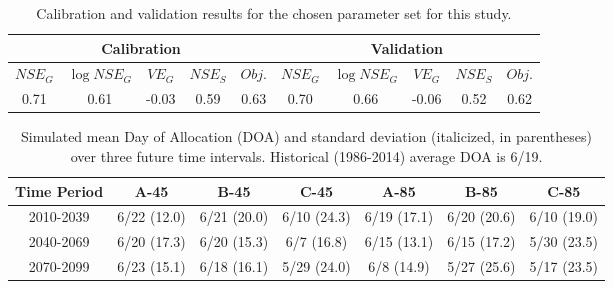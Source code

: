 \documentclass[water,article,submit,moreauthors,pdftex,10pt,a4paper]{mdpi}
\theoremstyle{mdpi}
\newcounter{re}
\theoremstyle{mdpidefinition}
\begin{document}
\begin{table}
\caption{Calibration and validation results for the chosen parameter set for this study.}
\label{table:CalValValues}
\centering
\begin{tabular}{c c c c c | c c c c c}
\hline\hline
\multicolumn{5}{c}{Calibration} & \multicolumn{5}{c}{Validation} \\
\hline
$NSE_G$ & $\log NSE_G$ & $VE_G$ & $NSE_S$ & $Obj.$ & $NSE_G$ & $\log NSE_G$ & $VE_G$ & $NSE_S$ & $Obj.$ \\
\hline
0.71 & 0.61 & -0.03 & 0.59 & 0.63 & 0.70 & 0.66 & -0.06 & 0.52 & 0.62 \\
\hline
\hline
\end{tabular}
\end{table}
\clearpage

\begin{table}
\caption{Simulated mean Day of Allocation (DOA) and standard deviation (italicized, in parentheses) over three future time intervals. Historical (1986-2014) average DOA is 6/19.}
\label{table:SimulatedDOA}
\centering
\begin{tabular}{c c c c c c c}
\hline\hline
Time Period & A-45 & B-45 & C-45 & A-85 & B-85 & C-85 \\
\hline
2010-2039 & 6/22 (12.0) & 6/21 (20.0) & 6/10 (24.3) & 6/19 (17.1) & 6/20 (20.6) & 6/10 (19.0) \\
2040-2069 & 6/20 (17.3) & 6/20 (15.3) & 6/7 (16.8) & 6/15 (13.1) & 6/15 (17.2) & 5/30 (23.5) \\
2070-2099 & 6/23 (15.1) & 6/18 (16.1) & 5/29 (24.0) & 6/8 (14.9) & 5/27 (25.6) & 5/17 (23.5) \\
\hline
\hline
\end{tabular}
\end{table}
\clearpage
\end{document}
